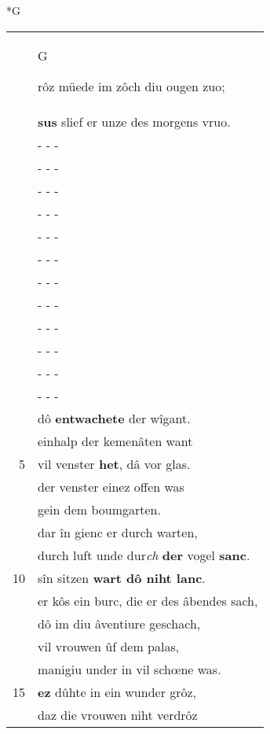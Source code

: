 \documentclass[8pt,a4paper,notitlepage]{article}
\begin{document}
\begin{table}[ht]
\begin{minipage}[t]{0.5\linewidth}
\small
\begin{center}*G
\end{center}
\begin{tabular}{rl}
 & \begin{large}G\end{large}rôz müede im zôch diu ougen zuo;\\ 
 & \textbf{sus} slief er unze des morgens vruo.\\ 
 & \multicolumn{1}{l}{ - - - }\\ 
 & \multicolumn{1}{l}{ - - - }\\ 
 & \multicolumn{1}{l}{ - - - }\\ 
 & \multicolumn{1}{l}{ - - - }\\ 
 & \multicolumn{1}{l}{ - - - }\\ 
 & \multicolumn{1}{l}{ - - - }\\ 
 & \multicolumn{1}{l}{ - - - }\\ 
 & \multicolumn{1}{l}{ - - - }\\ 
 & \multicolumn{1}{l}{ - - - }\\ 
 & \multicolumn{1}{l}{ - - - }\\ 
 & \multicolumn{1}{l}{ - - - }\\ 
 & \multicolumn{1}{l}{ - - - }\\ 
 & dô \textbf{entwachete} der wîgant.\\ 
 & einhalp der kemenâten want\\ 
5 & vil venster \textbf{het}, dâ vor glas.\\ 
 & der venster einez offen was\\ 
 & gein dem boumgarten.\\ 
 & dar în gienc er durch warten,\\ 
 & durch luft unde dur\textit{ch} \textbf{der} vogel \textbf{sanc}.\\ 
10 & sîn sitzen \textbf{wart dô niht lanc}.\\ 
 & er kôs ein burc, die er des âbendes sach,\\ 
 & dô im diu âventiure geschach,\\ 
 & vil vrouwen ûf dem palas,\\ 
 & manigiu under in vil schœne was.\\ 
15 & \textbf{ez} dûhte in ein wunder grôz,\\ 
 & daz die vrouwen niht verdrôz\\ 

\end{tabular}
\end{minipage}
\end{table}
\end{document}
